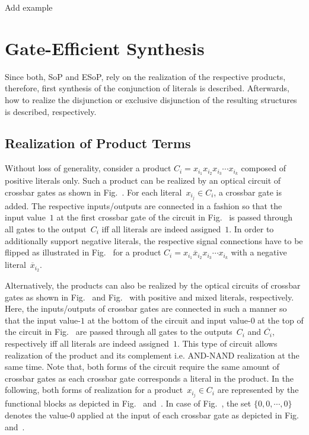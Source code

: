 \documentclass[10pt,letterpaper,twoside,openright]{book}
\begin{document}
\begin{example}
Add example
\end{example}

\section{Gate-Efficient Synthesis}
Since both, SoP and ESoP, rely on the realization of the respective products, therefore, first synthesis of the conjunction of literals is described. Afterwards, how to realize the disjunction or exclusive disjunction of the resulting structures is described, respectively.

\subsection{Realization of Product Terms}
Without loss of generality, 
consider a product \mbox{$C_{i}=x_{i_{1}}x_{i_{2}}x_{i_{3}}\cdots x_{i_{k}}$} composed of positive
literals only.
Such a product can be realized by an optical circuit of crossbar gates as shown in 
Fig.~. 
For each literal~$x_{i_{j}}\in C_{i}$,
a crossbar gate is added. The respective inputs/outputs are connected in a fashion
so that the input value~$1$ at the first crossbar gate of the circuit in Fig.~ is passed through all gates to the output~$C_{i}$ iff all literals are indeed assigned~$1$. In order to additionally support negative literals, the respective signal connections have to
be flipped as illustrated in Fig.~ for a product 
$C_{i}=x_{i_{1}}\overline{x}_{i_{2}}x_{i_{3}}\cdots x_{i_{k}}$
with a negative literal~$\overline{x}_{i_{2}}$.

Alternatively, the products can also be realized by the optical circuits of crossbar gates as shown in   Fig.~ and Fig.~ with positive and mixed literals, respectively. Here, the inputs/outputs of crossbar gates are connected in such a manner so that the input value-$1$ at the bottom of the circuit and input value-$0$ at the top of the circuit in Fig.~ are passed through all gates to the outputs~$C_{i}$ and $\overline{C_{i}}$, respectively iff all literals are indeed assigned~$1$. This type of circuit allows realization of the product and its complement i.e. AND-NAND realization at the same time.
Note that, both forms of the circuit require the same amount of crossbar gates as each crossbar gate corresponds a literal in the product. In the following, both forms of realization for a product~\mbox{$x_{i_{j}}\in C_{i}$} are represented by the functional blocks as depicted in Fig.~ and~. In case of Fig.~, the set $\{0,0,\cdots,0\}$ denotes the value-$0$ applied at the input of each crossbar gate as depicted in Fig.~ and~.  
\end{document}
